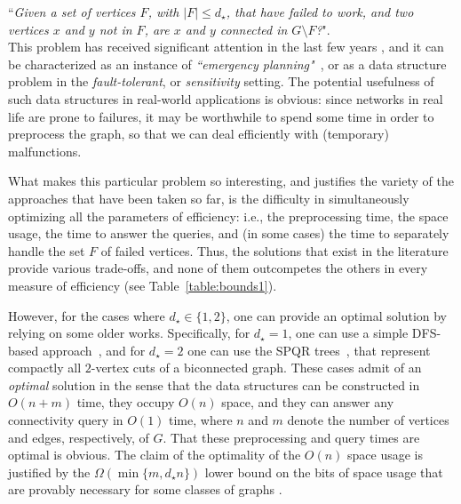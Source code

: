 \documentclass[11pt,a4paper]{article}
\begin{document}
``\emph{Given a set of vertices $F$, with $|F|\leq d_{\star}$, that have failed to work, and two vertices $x$ and $y$ not in $F$, are $x$ and $y$ connected in $G\setminus F$?}".\\

This problem has received significant attention in the last few years \cite{DBLP:journals/siamcomp/DuanP20,DBLP:conf/icalp/PilipczukSSTV22,DBLP:conf/focs/LongS22,DBLP:conf/esa/Kosinas23,DBLP:conf/icalp/LongW24}, and it can be characterized as an instance of \emph{``emergency planning"}~\cite{DBLP:conf/focs/PatrascuT07}, or as a data structure problem in the \emph{fault-tolerant}, or \emph{sensitivity} setting. 
The potential usefulness of such data structures in real-world applications is obvious: since networks in real life are prone to failures, it may be worthwhile to spend some time in order to preprocess the graph, so that we can deal efficiently with (temporary) malfunctions.

What makes this particular problem so interesting, and justifies the variety of the approaches that have been taken so far, is the difficulty in simultaneously optimizing all the parameters of efficiency: i.e., the preprocessing time, the space usage, the time to answer the queries, and (in some cases) the time to separately handle the set $F$ of failed vertices. Thus, the solutions that exist in the literature provide various trade-offs, and none of them outcompetes the others in every measure of efficiency (see Table~\ref{table:bounds1}).

However, for the cases where $d_{\star}\in\{1,2\}$, one can provide an optimal solution by relying on some older works. Specifically, for $d_{\star}=1$, one can use a simple DFS-based approach~\cite{DBLP:journals/siamcomp/Tarjan72}, and for $d_{\star}=2$ one can use the SPQR trees~\cite{DBLP:journals/algorithmica/BattistaT96,DBLP:journals/siamcomp/HopcroftT73,DBLP:conf/gd/GutwengerM00}, that represent compactly all $2$-vertex cuts of a biconnected graph. These cases admit of an \emph{optimal} solution in the sense that the data structures can be constructed in $O(n+m)$ time, they occupy $O(n)$ space, and they can answer any connectivity query in $O(1)$ time, where $n$ and $m$ denote the number of vertices and edges, respectively, of $G$. That these preprocessing and query times are optimal is obvious. The claim of the optimality of the $O(n)$ space usage is justified by the $\Omega(\min\{m,d_{\star}n\})$ lower bound on the bits of space usage that are provably necessary for some classes of graphs \cite{DBLP:journals/siamcomp/DuanP20}. 
\end{document}
